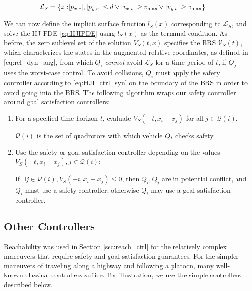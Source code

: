 \begin{equation}
\begin{aligned}
\mathcal{L}_S = \{x: &|p_{x,r}|, |p_{y,r}|\le d \vee |v_{x,i}| \ge v_\text{max} \vee |v_{y,i}| \ge v_\text{max} \}
\end{aligned}
\end{equation}

We can now define the implicit surface function $l_S(x)$ corresponding to $\mathcal{L}_S$, and solve the HJ PDE \eqref{eq:HJIPDE} using $l_S(x)$ as the terminal condition. As before, the zero sublevel set of the solution $V_S(t,x)$ specifies the BRS $\mathcal{V}_S(t)$, which characterizes the states in the augmented relative coordinates, as defined in \eqref{eq:rel_dyn_aug}, from which $Q_i$ \textit{cannot} avoid $\mathcal{L}_S$ for a time period of $t$, if $Q_j$ uses the worst-case control. To avoid collisions, $Q_i$ must apply the safety controller according to \eqref{eq:HJI_ctrl_syn} on the boundary of the BRS in order to avoid going into the BRS. The following algorithm wraps our safety controller around goal satisfaction controllers:

\begin{enumerate}
\item For a specified time horizon $t$, evaluate $V_S(-t,x_i-x_j)$ for all $j\in \mathcal{Q}(i)$.

$\mathcal{Q}(i)$ is the set of quadrotors with which vehicle $Q_{i}$ checks safety.
\item Use the safety or goal satisfaction controller depending on the values $V_S(-t,x_i-x_j),j\in \mathcal{Q}(i)$: 

If $\exists j\in \mathcal{Q}(i),V_S(-t,x_i-x_j)\le 0$, then $Q_i,Q_j$ are in potential conflict, and $Q_i$ must use a safety controller; otherwise $Q_i$ may use a goal satisfaction controller.
\end{enumerate}

\subsection{Other Controllers \label{sec:other_ctrl}}
Reachability was used in Section \ref{sec:reach_ctrl} for the relatively complex maneuvers that require safety and goal satisfaction guarantees. For the simpler maneuvers of traveling along a highway and following a platoon, many well-known classical controllers suffice. For illustration, we use the simple controllers described below.

